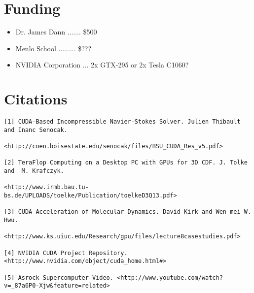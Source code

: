 \documentclass{article}      %
\begin{document}
\section{Funding}

\begin{itemize}
	\item Dr. James Dann ....... \$500
	\item Menlo School ......... \$???
	\item NVIDIA Corporation ...  2x GTX-295 or 2x Tesla C1060?
\end{itemize}

\section{Citations}

\begin{verbatim}
[1] CUDA-Based Incompressible Navier-Stokes Solver. Julien Thibault and Inanc Senocak.

<http://coen.boisestate.edu/senocak/files/BSU_CUDA_Res_v5.pdf>

[2] TeraFlop Computing on a Desktop PC with GPUs for 3D CDF. J. Tolke and  M. Krafczyk.  

<http://www.irmb.bau.tu-bs.de/UPLOADS/toelke/Publication/toelkeD3Q13.pdf>

[3] CUDA Acceleration of Molecular Dynamics. David Kirk and Wen-mei W. Hwu.  

<http://www.ks.uiuc.edu/Research/gpu/files/lecture8casestudies.pdf>

[4] NVIDIA CUDA Project Repository. <http://www.nvidia.com/object/cuda_home.html#>

[5] Asrock Supercomputer Video. <http://www.youtube.com/watch?v=_87a6P0-Xjw&feature=related>
\end{verbatim}
\end{document}
